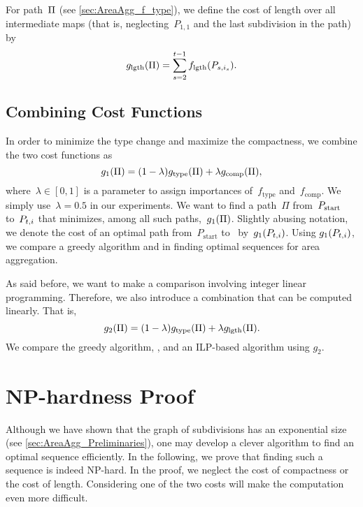For path~$\Pi$ (see \sect\ref{sec:AreaAgg_f_type}), 
we define the cost of length over all 
intermediate maps 
(that is, neglecting~$P_{1,1}$ 
and the last subdivision in the path) by
\begin{equation}
\label{eq:g_length}
g_\mathrm{lgth}(\Pi)=
\sum_{s=2}^{t-1}f_{\mathrm{lgth}}(P_{s,i_s}).
\end{equation}

\subsection{Combining Cost Functions}
\label{sec:AreaAgg_Combining}
In order to minimize the type change 
and maximize the compactness,
we combine the two cost functions as
\begin{equation}
\label{eq:g_1}
g_1(\Pi)= (1-\lambda)g_\mathrm{type}(\Pi)
+\lambda g_\mathrm{comp}(\Pi),
\end{equation}
where~$\lambda \in [0,1]$ is a parameter 
to assign importances 
of~$f_\mathrm{type}$ and~$f_\mathrm{comp}$.
We simply use~$\lambda=0.5$ in our experiments. 
We want to find a path~$\Pi$ from~$P_\mathrm{start}$ to~$P_{t,i}$ 
that minimizes, among all such paths,~$g_1(\Pi)$.
Slightly abusing notation, we denote the cost of
an optimal path from~${P}_{\mathrm{start}}$ to~\Pnode 
by~$g_1(P_{t,i})$.
Using $g_1(P_{t,i})$, we compare a greedy algorithm and \Astar
in finding optimal sequences for area aggregation.

As said before, we want to make a comparison involving
integer linear programming.
Therefore, we also introduce a combination
that can be computed linearly. That is,
\begin{equation}
\label{eq:g_2}
g_2(\Pi)= (1-\lambda)g_\mathrm{type}(\Pi)
+\lambda g_\mathrm{lgth}(\Pi).
\end{equation}
We compare the greedy algorithm, \Astar, and an ILP-based 
algorithm using $g_2$.

\section{NP-hardness Proof}
\label{sec:AreaAgg_NP-hardness}

Although we have shown that the graph of subdivisions
has an exponential size
(see \sect\ref{sec:AreaAgg_Preliminaries}),
one may develop a clever algorithm 
to find an optimal sequence efficiently.
In the following, we prove that 
finding such a sequence is indeed NP-hard.
In the proof, we neglect the cost of compactness or the cost of length.
Considering one of the two costs 
will make the computation even more difficult.


